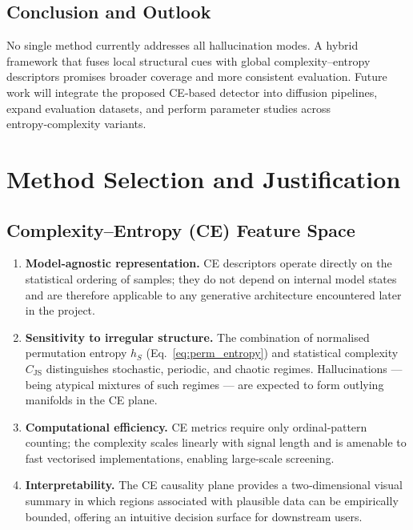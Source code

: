 \documentclass{article}
\begin{document}
\subsection{Conclusion and Outlook}\label{sec:conclusion}

No single method currently addresses all hallucination modes.  A
hybrid framework that fuses local structural cues with global
complexity–entropy descriptors promises broader coverage and more
consistent evaluation.  Future work will integrate the proposed CE‑based
detector into diffusion pipelines, expand evaluation datasets, and
perform parameter studies across entropy‑complexity variants.

\section{Method Selection and Justification}\label{sec:method_choice}

\subsection{Complexity–Entropy (CE) Feature Space}

\begin{enumerate}
\item \textbf{Model‑agnostic representation.}
      CE descriptors operate directly on the statistical ordering of
      samples; they do not depend on internal model states and are
      therefore applicable to any generative architecture encountered
      later in the project.
\item \textbf{Sensitivity to irregular structure.}
      The combination of normalised permutation entropy $h_S$
      (Eq.~\ref{eq:perm_entropy}) and statistical complexity
      $C_{\mathrm{JS}}$ distinguishes stochastic, periodic, and chaotic
      regimes.  Hallucinations — being atypical mixtures of such regimes — 
      are expected to form outlying manifolds in the CE plane.
\item \textbf{Computational efficiency.}
      CE metrics require only ordinal‑pattern counting; the complexity
      scales linearly with signal length and is amenable to fast vectorised
      implementations, enabling large‑scale screening.
\item \textbf{Interpretability.}
      The CE causality plane provides a two‑dimensional visual summary
      in which regions associated with plausible data can be empirically
      bounded, offering an intuitive decision surface for downstream
      users.
\end{enumerate}
\end{document}
